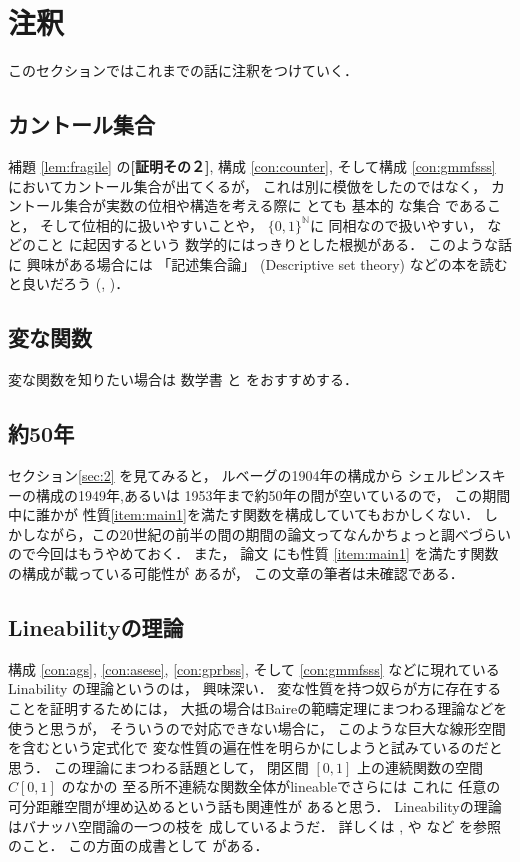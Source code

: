 \documentclass[leqno, a4paper, 12pt]{jsarticle}
\theoremstyle{definition}
\newcommand{\nn}{\mathbb{N}}
\begin{document}
\section{注釈}\label{sec:3}
このセクションではこれまでの話に注釈をつけていく．

\subsection{カントール集合}
補題
\ref{lem:fragile}
の\textbf{[証明その２]}, 
構成
\ref{con:counter}, 
\cite[Sec.3]{MR3293811}
そして構成
\ref{con:gmmfsss}
においてカントール集合が出てくるが，
これは別に模倣をしたのではなく，
カントール集合が実数の位相や構造を考える際に
とても
基本的
な集合
であること，
そして位相的に扱いやすいことや，
$\{0,1 \}^{\nn}$に
同相なので扱いやすい，
などのこと
に起因するという
数学的にはっきりとした根拠がある．
このような話に
興味がある場合には
「記述集合論」
(Descriptive set theory)
などの本を読むと良いだろう
(\cite{MR1321597}, 
\cite{MR1619545})．



\subsection{変な関数}
変な関数を知りたい場合は
数学書
\cite{MR2067444}
と
\cite{MR3645463}
をおすすめする．


\subsection{約50年}
セクション\ref{sec:2}
を見てみると，
ルベーグの1904年の構成から
シェルピンスキーの構成の1949年,あるいは
1953年まで約50年の間が空いているので，
この期間中に誰かが
性質\ref{item:main1}を満たす関数を構成していてもおかしくない．
しかしながら，この20世紀の前半の間の期間の論文ってなんかちょっと調べづらいので今回はもうやめておく．
また，
論文
\cite{MR0393377}
にも性質
\ref{item:main1}
を満たす関数の構成が載っている可能性が
あるが，
この文章の筆者は未確認である．


\subsection{Lineabilityの理論}
構成
\ref{con:ags}, 
\ref{con:asese}, 
\ref{con:gprbss}, 
そして
\ref{con:gmmfsss}
などに現れているLinability
の理論というのは，
興味深い．
変な性質を持つ奴らが方に存在することを証明するためには，
大抵の場合はBaireの範疇定理にまつわる理論などを使うと思うが，
そういうので対応できない場合に，
このような巨大な線形空間を含むという定式化で
変な性質の遍在性を明らかにしようと試みているのだと思う．
この理論にまつわる話題として，
閉区間
$[0, 1]$
上の連続関数の空間
$C[0, 1]$
のなかの
至る所不連続な関数全体がlineableでさらには
これに
任意の可分距離空間が埋め込めるという話も関連性が
あると思う．
Lineabilityの理論はバナッハ空間論の一つの枝を
成しているようだ．
詳しくは
\cite{MR3119823}, 
\cite{MR2643865}
や
\cite{MR2113929}
など
を参照のこと．
この方面の成書として
\cite{MR3445906}
がある．
\end{document}
